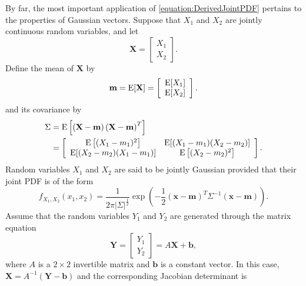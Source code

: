 \begin{example}
By far, the most important application of \eqref{equation:DerivedJointPDF} pertains to the properties of Gaussian vectors.
Suppose that $X_1$ and $X_2$ are jointly continuous random variables, and let
\begin{equation*}
\mathbf{X} = \left[ \begin{array}{c} X_1 \\ X_2 \end{array} \right] .
\end{equation*}
Define the mean of $\mathbf{X}$ by
\begin{equation*}
\mathbf{m} = \mathrm{E} [\mathbf{X}] 
= \left[ \begin{array}{c} \mathrm{E}[ X_1 ] \\ \mathrm{E}[ X_2 ] \end{array} \right] .
\end{equation*}
and its covariance by
\begin{equation*}
\begin{split}
\Sigma &= \mathrm{E} \left[ \left( \mathbf{X} - \mathbf{m} \right)
\left(\mathbf{X} - \mathbf{m} \right)^T \right] \\
&= \left[ \begin{array}{cc} \mathrm{E} \left[ (X_1 - m_1)^2 \right] &
\mathrm{E}[ (X_1 - m_1) (X_2 - m_2) ]  \\
\mathrm{E}[ (X_2 - m_2) (X_1 - m_1) ] &
\mathrm{E} \left[ (X_2 - m_2)^2 \right] \end{array} \right] .
\end{split}
\end{equation*}
Random variables $X_1$ and $X_2$ are said to be jointly Gaussian provided that their joint PDF is of the form
\begin{equation*}
f_{X_1, X_2} (x_1, x_2) = \frac{1}{2 \pi |\Sigma|^{\frac{1}{2}}}
\exp \left( - \frac{1}{2} \left( \mathbf{x} - \mathbf{m} \right)^T \Sigma^{-1} \left( \mathbf{x} - \mathbf{m} \right) \right) .
\end{equation*}
Assume that the random variables $Y_1$ and $Y_2$ are generated through the matrix equation
\begin{equation*}
\mathbf{Y} = \left[ \begin{array}{c} Y_1 \\ Y_2 \end{array} \right]
= A \mathbf{X} + \mathbf{b} ,
\end{equation*}
where $A$ is a $2 \times 2$ invertible matrix and $\mathbf{b}$ is a constant vector.
In this case, $\mathbf{X} = A^{-1} \left( \mathbf{Y} - \mathbf{b} \right)$ and the corresponding Jacobian determinant is

\end{example}
